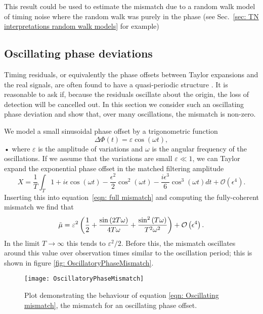 \documentclass[../full_thesis/full_thesis.tex]{subfiles}
\begin{document}
This result could be used to estimate the mismatch due to a random walk model
of timing noise where the random walk was purely in the phase (see
Sec.~\ref{sec: TN interpretations random walk models} for example)

\subsection{Oscillating phase deviations}

Timing residuals, or equivalently the phase offsets between Taylor expansions
and the real signals, are often found to have a quasi-periodic structure
\citep{Hobbs2010}. It is reasonable to ask if, because the residuals oscillate
about the origin, the loss of detection will be cancelled out. In this section
we consider such an oscillating phase deviation and show that, over many
oscillations, the mismatch is non-zero.

We model a small sinusoidal phase offset by a trigonometric function
\begin{equation}
\Delta \Phi(t) = \varepsilon \cos(\omega t),
\end{equation}•
where $\varepsilon$ is the amplitude of variations and $\omega$ is the angular
frequency of the oscillations. If we assume that the variations are small
$\varepsilon \ll 1$, we can Taylor expand the exponential phase offset in
the matched filtering amplitude
\begin{equation}
X = \frac{1}{T}\int_{T}
1 + i \epsilon \cos{\left (\omega t \right )}
- \frac{\epsilon^{2}}{2} \cos^{2}{\left (\omega t \right )}
- \frac{i \epsilon^{3}}{6} \cos^{3}{\left (\omega t \right )}
dt
+ \mathcal{O}\left(\epsilon^{4}\right).
\end{equation}
Inserting this into equation~\eqref{eqn: full mismatch} and computing the
fully-coherent mismatch we find that
\begin{equation}
\tilde{\mu} = \varepsilon^{2} \left(\frac{1}{2}
+ \frac{\sin{\left (2 T \omega \right )}}{4 T \omega}
+ \frac{\sin^{2}{\left (T \omega \right )}}{T^{2} \omega^{2}} \right)
+ \mathcal{O}\left(\epsilon^{4}\right).
\label{eqn: Oscillating mismatch}
\end{equation}
In the limit $T \rightarrow \infty$ this tends to $\varepsilon^{2}/2$. Before
this, the mismatch oscillates around this value over observation times similar
to the oscillation period; this is shown in figure \ref{fig:
OscillatoryPhaseMismatch}.
\begin{figure}[ht]
\centering
\texttt{[image: OscillatoryPhaseMismatch]}
\caption{Plot demonstrating the behaviour of equation
         \eqref{eqn: Oscillating mismatch}, the mismatch for an oscillating
         phase offset.}
\label{fig: OscillatoryPhaseMismatch}
\end{figure}
\end{document}
